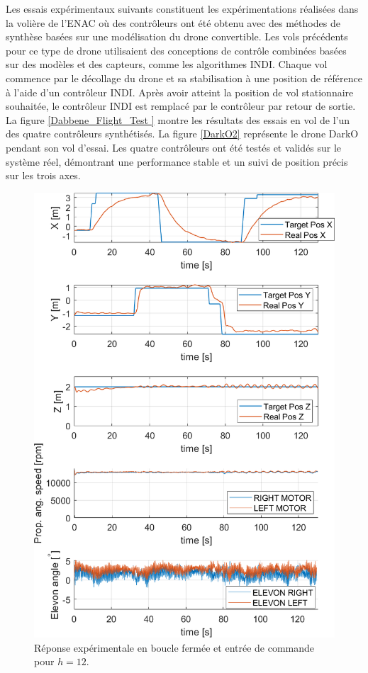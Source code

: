 Les essais expérimentaux suivants constituent les expérimentations réalisées dans la volière de l'ENAC où des contrôleurs ont été obtenu avec des méthodes de synthèse basées sur une modélisation du drone convertible. Les vols précédents pour ce type de drone utilisaient des conceptions de contrôle combinées basées sur des modèles et des capteurs, comme les algorithmes INDI. Chaque vol commence par le décollage du drone et sa stabilisation à une position de référence à l'aide d'un contrôleur INDI. Après avoir atteint la position de vol stationnaire souhaitée, le contrôleur INDI est remplacé par le contrôleur par retour de sortie. La figure \ref{Dabbene_Flight_Test } montre les résultats des essais en vol de l'un des quatre contrôleurs synthétisés. La figure \ref{DarkO2} représente le drone DarkO pendant son vol d'essai. Les quatre contrôleurs ont été testés et validés sur le système réel, démontrant une performance stable et un suivi de position précis sur les trois axes.


\begin{figure}[ht!]
    \centering
    \includegraphics[width=0.6\columnwidth]{figures/realflight_z_adjust_x_adjust_final_HopeCrop.png}
   \vspace{-0.5cm}\caption{Réponse expérimentale en boucle fermée et entrée de commande pour $h = 12$.}
    \label{Dabbene_Flight_Test}
\end{figure}

